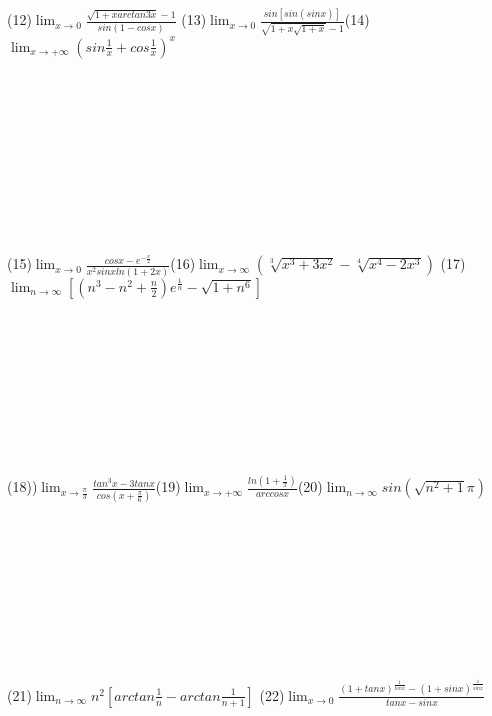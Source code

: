 \documentclass[UTF8]{ctexart}
\begin{document}
 (12)$\displaystyle{\lim_{x \to 0}\frac{\sqrt{1+xarctan3x}-1}{sin(1-cosx)}}$ \quad \quad  \quad (13)$\displaystyle{\lim_{x \to 0}\frac{sin[sin(sinx)]}{\sqrt{1+x\sqrt{1+x}} -1}}$\quad \quad \quad (14)$\displaystyle{\lim_{x \to +\infty}(sin\frac{1}{x}+cos\frac{1}{x})^x}$
 \\ \\ \\ \\ \\ \\ \\ \\ \\ \\ \\
 (15)$\displaystyle{\lim_{x \to 0}\frac{cosx-e^{-\frac{x}{2}}}{x^2sinxln(1+2x)}}$\quad\quad\quad (16)$\displaystyle{\lim_{x \to \infty}(\sqrt[3]{x^3+3x^2}-\sqrt[4]{x^4-2x^3})}$ \quad\quad\quad(17)$\displaystyle{\lim_{n \to \infty}[(n^3-n^2+\frac{n}{2})e^{\frac{1}{n}}-\sqrt{1+n^6}]}$
 \\ \\ \\ \\ \\ \\ \\ \\ \\ \\
 (18))$\displaystyle{\lim_{x \to \frac{\pi}{3} }\frac{tan^3x-3tanx}{cos(x+\frac{\pi}{6})}}$\quad\quad\quad(19)$\displaystyle{\lim_{x \to +\infty }\frac{ln(1+\frac{1}{x})}{arccosx}}$\quad\quad\quad(20)$\displaystyle{\lim_{n \to \infty}sin(\sqrt{n^2+1}\pi)}$
 \\ \\ \\ \\ \\ \\ \\ \\ \\ \\
 (21)$\displaystyle{\lim_{n \to \infty }n^2[arctan\frac{1}{n}-arctan\frac{1}{n+1}]}$ \quad\quad\quad (22)$\displaystyle{\lim_{x \to 0}\frac{(1+tanx)^{\frac{1}{tanx}}-(1+sinx)^{\frac{1}{sinx}}}{tanx-sinx}}$
 \\ \\ \\ \\ \\ \\ \\ \\ \\ \\ \\
\end{document}
